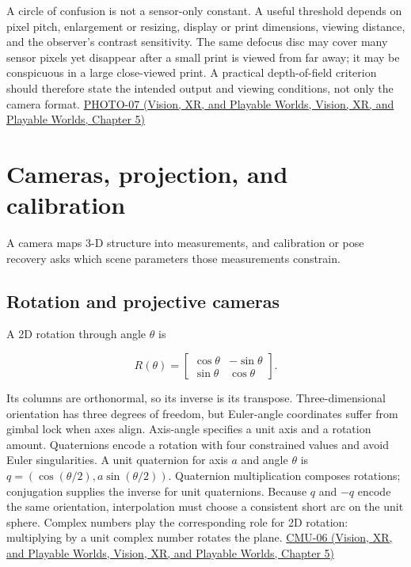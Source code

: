 A circle of confusion is not a sensor-only constant. A useful threshold depends on pixel pitch, enlargement or resizing, display or print dimensions, viewing distance, and the observer's contrast sensitivity. The same defocus disc may cover many sensor pixels yet disappear after a small print is viewed from far away; it may be conspicuous in a large close-viewed print. A practical depth-of-field criterion should therefore state the intended output and viewing conditions, not only the camera format. \href{../07-Vision-XR-and-Playable-Worlds/main.pdf\#nameddest=04-visual-computing-ii-ch036-photo-07---photography-session-07}{PHOTO-07 (Vision, XR, and Playable Worlds, Vision, XR, and Playable Worlds, Chapter 5)}

\section{Cameras, projection, and calibration}\label{03-visual-computing-i-ch003-cameras-projection-and-calibration}

A camera maps 3-D structure into measurements, and calibration or pose recovery asks which scene parameters those measurements constrain.

\subsection{Rotation and projective cameras}\label{03-visual-computing-i-ch003-rotation-and-projective-cameras}

A 2D rotation through angle \(\theta\) is

\[
R(\theta)=\begin{bmatrix}\cos\theta&-\sin\theta\\\sin\theta&\cos\theta\end{bmatrix}.
\]

Its columns are orthonormal, so its inverse is its transpose. Three-dimensional orientation has three degrees of freedom, but Euler-angle coordinates suffer from gimbal lock when axes align. Axis-angle specifies a unit axis and a rotation amount. Quaternions encode a rotation with four constrained values and avoid Euler singularities. A unit quaternion for axis \(a\) and angle \(\theta\) is \(q=(\cos(\theta/2),a\sin(\theta/2))\). Quaternion multiplication composes rotations; conjugation supplies the inverse for unit quaternions. Because \(q\) and \(-q\) encode the same orientation, interpolation must choose a consistent short arc on the unit sphere. Complex numbers play the corresponding role for 2D rotation: multiplying by a unit complex number rotates the plane. \href{../07-Vision-XR-and-Playable-Worlds/main.pdf\#nameddest=04-visual-computing-ii-ch036-cmu-06---3d-rotations-and-complex-representations}{CMU-06 (Vision, XR, and Playable Worlds, Vision, XR, and Playable Worlds, Chapter 5)}

